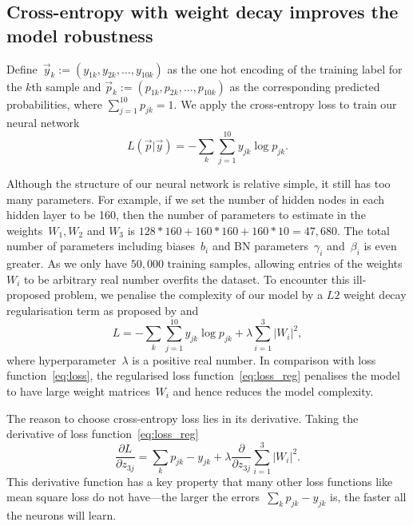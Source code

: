 \subsection{Cross-entropy with weight decay improves the model robustness}
Define~$\vec y_k:=(y_{1k},y_{2k},\ldots,y_{10k})$ as the one hot encoding of the training label for the $k$th sample and $\vec p_k:=(p_{1k},p_{2k},\ldots,p_{10k})$ as the corresponding predicted probabilities, where $\sum_{j=1}^{10} p_{jk}=1$. We apply the cross-entropy loss to train our neural network
\begin{equation}
  {L(\vec p|\vec y)=-\sum_{k}\sum _{j=1}^{10} y_{jk}\log p_{jk}}.  \label{eq:loss}
\end{equation}

Although the structure of our neural network is relative simple, it still has too many parameters. For example, if we set the number of hidden nodes in each hidden layer to be 160, then the number of parameters to estimate in the weights~$W_1,W_2$ and $W_3$ is $128*160+160*160+160*10=47,680$. The total number of parameters including biases~$b_i$ and BN parameters~$\gamma_i$ and~$\beta_i$ is even greater. As we only have $50,000$ training samples, allowing entries of the weights~$W_i$ to be arbitrary real number overfits the dataset. To encounter this ill-proposed problem, we penalise the complexity of our model by a $L2$ weight decay regularisation term as proposed by \citet{NIPS1991563} and \citet{doi:10.1080/00401706.1970.10488634}
\begin{equation}
  {L=-\sum_k\sum _{j=1}^{10} y_{jk}\log p_{jk}}+\lambda\sum _{i=1}^3\left|W_i\right|^2,  \label{eq:loss_reg}
\end{equation}
where hyperparameter~$\lambda$ is a positive real number.
In comparison with loss function~\eqref{eq:loss}, the regularised loss function~\eqref{eq:loss_reg} penalises the model to have large weight matrices~$W_i$ and hence reduces the model complexity.

The reason to choose cross-entropy loss lies in its derivative. Taking the derivative of loss function~\eqref{eq:loss_reg}
\begin{equation*}
  \frac{\partial L}{\partial z_{3j}}=\sum_k p_{jk}-y_{jk}+\lambda\frac{\partial }{\partial z_{3j}}\sum _{i=1}^3\left|W_i\right|^2.  
\end{equation*}
This derivative function has a key property that many other loss functions like mean square loss do not have---the larger the errors~$\sum_k p_{jk}-y_{jk}$ is, the faster all the neurons will learn.

